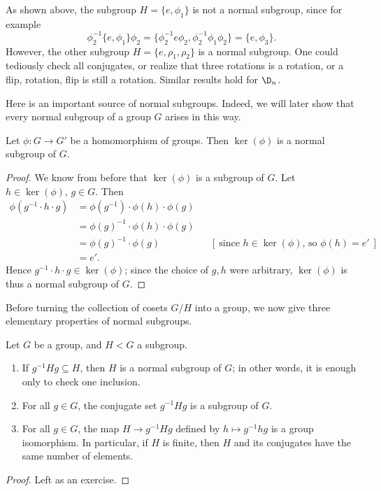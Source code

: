 \documentclass[math1530-lecture-notes]{subfiles}
\begin{document}
\begin{example}
  As shown above, the subgroup $H=\{ e,\phi_1 \}$ is not a normal subgroup, since for example \[
    \phi_2^{-1}\{ e,\phi_1 \}\phi_2=\{ \phi_2^{-1}e\phi_2,\phi_2^{-1}\phi_1\phi_2 \}=\{ e,\phi_3 \}
  .\] However, the other subgroup $H=\{ e,\rho_1,\rho_2 \}$ is a normal subgroup. One could
  tediously check all conjugates, or realize that three rotations is a rotation, or a flip,
  rotation, flip is still a rotation. Similar results hold for $\D_n$.
\end{example}

Here is an important source of normal subgroups. Indeed, we will later show that every normal
subgroup of a group $G$ arises in this way.
\begin{proposition}
  Let $\phi:G\to G'$ be a homomorphism of groups. Then $\ker{(\phi)}$ is a normal subgroup of $G$.
\end{proposition}
\begin{proof}[Proof]
  We know from before that $\ker{(\phi)}$ is a subgroup of $G$. Let $h\in \ker{(\phi)}$, $g\in G$.
  Then
  \begin{align*}
    \phi(g^{-1}\cdot h\cdot g)&= \phi(g^{-1}) \cdot \phi(h)\cdot \phi(g)\\
                              &=\phi(g)^{-1}\cdot \phi(h)\cdot \phi(g)\\
                              &=\phi(g)^{-1}\cdot \phi(g) && [~\text{since $h\in \ker{(\phi)}$, so
                              $\phi(h)=e'$}~]\\
                              &= e'
  .\end{align*}
  Hence $g^{-1}\cdot h\cdot g\in \ker{(\phi)}$; since the choice of $g,h$ were arbitrary,
  $\ker{(\phi)}$ is thus a normal subgroup of $G$.
\end{proof}

Before turning the collection of cosets $G / H$ into a group, we now give three elementary
properties of normal subgroups. 
\begin{proposition}{}
  Let $G$ be a group, and $H < G$ a subgroup.
  \begin{enumerate}
    \item If $g^{-1}Hg\subseteq H$, then $H$ is a normal subgroup of $G$; in other words, it is
      enough only to check one inclusion.
    \item For all $g\in G$, the conjugate set $g^{-1}Hg$ is a subgroup of $G$.
    \item For all $g\in G$, the map $H\to g^{-1}Hg$ defined by $h\mapsto g^{-1}hg$ is a group
      isomorphism. In particular, if $H$ is finite, then $H$ and its conjugates have the same number
      of elements.
  \end{enumerate}
\end{proposition}
\begin{proof}[Proof]
  Left as an exercise.
\end{proof}
\end{document}
